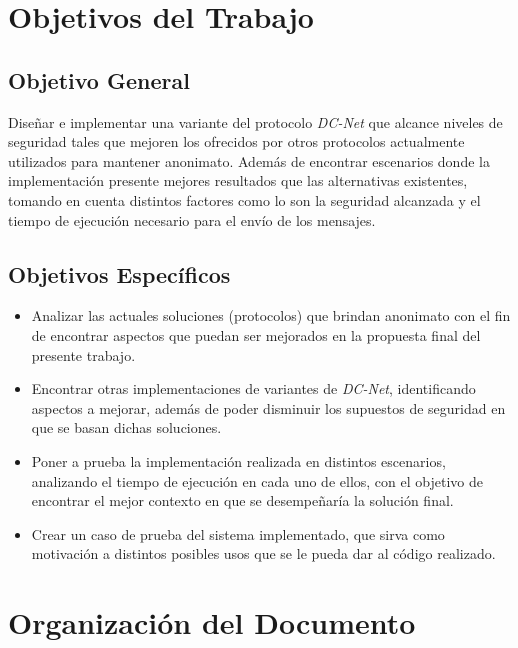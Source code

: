 \section{Objetivos del Trabajo}

\subsection{Objetivo General}

Diseñar e implementar una variante del protocolo \emph{DC-Net} que alcance niveles de seguridad tales que mejoren los ofrecidos por otros protocolos actualmente utilizados para mantener anonimato. Además de encontrar escenarios donde la implementación presente mejores resultados que las alternativas existentes, tomando en cuenta distintos factores como lo son la seguridad alcanzada y el tiempo de ejecución necesario para el envío de los mensajes.

\subsection{Objetivos Específicos}

\begin{itemize}
    \item Analizar las actuales soluciones (protocolos) que brindan anonimato con el fin de encontrar aspectos que puedan ser mejorados en la propuesta final del presente trabajo.
    \item Encontrar otras implementaciones de variantes de \emph{DC-Net}, identificando aspectos a mejorar, además de poder disminuir los supuestos de seguridad en que se basan dichas soluciones.
    \item Poner a prueba la implementación realizada en distintos escenarios, analizando el tiempo de ejecución en cada uno de ellos, con el objetivo de encontrar el mejor contexto en que se desempeñaría la solución final.
    \item Crear un caso de prueba del sistema implementado, que sirva como motivación a distintos posibles usos que se le pueda dar al código realizado.
\end{itemize}

\section{Organización del Documento}

